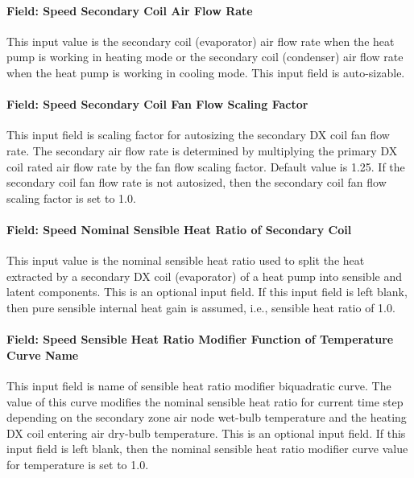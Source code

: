 \paragraph{Field: Speed Secondary Coil Air Flow Rate}\label{field-speed-secondary-coil-air-flow-rate}

This input value is the secondary coil (evaporator) air flow rate when the heat pump is working in heating mode or the secondary coil (condenser) air flow rate when the heat pump is working in cooling mode. This input field is auto-sizable.

\paragraph{Field: Speed Secondary Coil Fan Flow Scaling Factor}\label{field-speed-secondary-coil-fan-flow-scaling-factor}

This input field is scaling factor for autosizing the secondary DX coil fan flow rate. The secondary air flow rate is determined by multiplying the primary DX coil rated air flow rate by the fan flow scaling factor. Default value is 1.25. If the secondary coil fan flow rate is not autosized, then the secondary coil fan flow scaling factor is set to 1.0.

\paragraph{Field: Speed Nominal Sensible Heat Ratio of Secondary Coil}\label{field-speed-nominal-sensible-heat-ratio-of-secondary-coil}

This input value is the nominal sensible heat ratio used to split the heat extracted by a secondary DX coil (evaporator) of a heat pump into sensible and latent components. This is an optional input field. If this input field is left blank, then pure sensible internal heat gain is assumed, i.e., sensible heat ratio of 1.0.

\paragraph{Field: Speed Sensible Heat Ratio Modifier Function of Temperature Curve Name}\label{field-speed-sensible-heat-ratio-modifier-function-of-temperature-curve-name}

This input field is name of sensible heat ratio modifier biquadratic curve. The value of this curve modifies the nominal sensible heat ratio for current time step depending on the secondary zone air node wet-bulb temperature and the heating DX coil entering air dry-bulb temperature. This is an optional input field. If this input field is left blank, then the nominal sensible heat ratio modifier curve value for temperature is set to 1.0.

